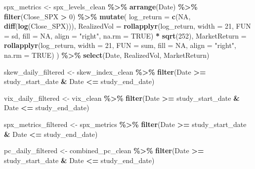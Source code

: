 \documentclass[
]{article}
\newenvironment{Shaded}{\begin{snugshade}}{\end{snugshade}}
\newcommand{\AttributeTok}[1]{\textcolor[rgb]{0.13,0.29,0.53}{#1}}
\newcommand{\ConstantTok}[1]{\textcolor[rgb]{0.56,0.35,0.01}{#1}}
\newcommand{\DecValTok}[1]{\textcolor[rgb]{0.00,0.00,0.81}{#1}}
\newcommand{\FunctionTok}[1]{\textcolor[rgb]{0.13,0.29,0.53}{\textbf{#1}}}
\newcommand{\NormalTok}[1]{#1}
\newcommand{\OtherTok}[1]{\textcolor[rgb]{0.56,0.35,0.01}{#1}}
\newcommand{\SpecialCharTok}[1]{\textcolor[rgb]{0.81,0.36,0.00}{\textbf{#1}}}
\newcommand{\StringTok}[1]{\textcolor[rgb]{0.31,0.60,0.02}{#1}}
\begin{document}
\begin{Shaded}
\begin{Highlighting}[]
\NormalTok{  spx\_metrics }\OtherTok{\textless{}{-}}\NormalTok{ spx\_levels\_clean }\SpecialCharTok{\%\textgreater{}\%}
    \FunctionTok{arrange}\NormalTok{(Date) }\SpecialCharTok{\%\textgreater{}\%}
    \FunctionTok{filter}\NormalTok{(Close\_SPX }\SpecialCharTok{\textgreater{}} \DecValTok{0}\NormalTok{) }\SpecialCharTok{\%\textgreater{}\%} 
    \FunctionTok{mutate}\NormalTok{(}
      \AttributeTok{log\_return =} \FunctionTok{c}\NormalTok{(}\ConstantTok{NA}\NormalTok{, }\FunctionTok{diff}\NormalTok{(}\FunctionTok{log}\NormalTok{(Close\_SPX))),}
      \AttributeTok{RealizedVol =} \FunctionTok{rollapplyr}\NormalTok{(log\_return, }\AttributeTok{width =} \DecValTok{21}\NormalTok{, }\AttributeTok{FUN =}\NormalTok{ sd, }\AttributeTok{fill =} \ConstantTok{NA}\NormalTok{, }\AttributeTok{align =} \StringTok{"right"}\NormalTok{, }\AttributeTok{na.rm =} \ConstantTok{TRUE}\NormalTok{) }\SpecialCharTok{*} \FunctionTok{sqrt}\NormalTok{(}\DecValTok{252}\NormalTok{),}
      \AttributeTok{MarketReturn =} \FunctionTok{rollapplyr}\NormalTok{(log\_return, }\AttributeTok{width =} \DecValTok{21}\NormalTok{, }\AttributeTok{FUN =}\NormalTok{ sum, }\AttributeTok{fill =} \ConstantTok{NA}\NormalTok{, }\AttributeTok{align =} \StringTok{"right"}\NormalTok{, }\AttributeTok{na.rm =} \ConstantTok{TRUE}\NormalTok{)}
\NormalTok{    ) }\SpecialCharTok{\%\textgreater{}\%}
    \FunctionTok{select}\NormalTok{(Date, RealizedVol, MarketReturn)}
  
\NormalTok{  skew\_daily\_filtered }\OtherTok{\textless{}{-}}\NormalTok{ skew\_index\_clean }\SpecialCharTok{\%\textgreater{}\%}
    \FunctionTok{filter}\NormalTok{(Date }\SpecialCharTok{\textgreater{}=}\NormalTok{ study\_start\_date }\SpecialCharTok{\&}\NormalTok{ Date }\SpecialCharTok{\textless{}=}\NormalTok{ study\_end\_date)}
  
\NormalTok{  vix\_daily\_filtered }\OtherTok{\textless{}{-}}\NormalTok{ vix\_clean }\SpecialCharTok{\%\textgreater{}\%}
    \FunctionTok{filter}\NormalTok{(Date }\SpecialCharTok{\textgreater{}=}\NormalTok{ study\_start\_date }\SpecialCharTok{\&}\NormalTok{ Date }\SpecialCharTok{\textless{}=}\NormalTok{ study\_end\_date)}
  
\NormalTok{  spx\_metrics\_filtered }\OtherTok{\textless{}{-}}\NormalTok{ spx\_metrics }\SpecialCharTok{\%\textgreater{}\%}
    \FunctionTok{filter}\NormalTok{(Date }\SpecialCharTok{\textgreater{}=}\NormalTok{ study\_start\_date }\SpecialCharTok{\&}\NormalTok{ Date }\SpecialCharTok{\textless{}=}\NormalTok{ study\_end\_date)}
  
\NormalTok{  pc\_daily\_filtered }\OtherTok{\textless{}{-}}\NormalTok{ combined\_pc\_clean }\SpecialCharTok{\%\textgreater{}\%}
    \FunctionTok{filter}\NormalTok{(Date }\SpecialCharTok{\textgreater{}=}\NormalTok{ study\_start\_date }\SpecialCharTok{\&}\NormalTok{ Date }\SpecialCharTok{\textless{}=}\NormalTok{ study\_end\_date)}
  

\end{Highlighting}
\end{Shaded}
\end{document}
